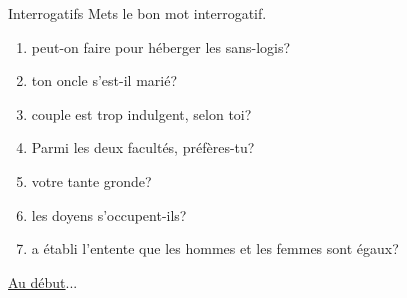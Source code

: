 \begin{frame}{Interrogatifs}
  Mets le bon mot interrogatif.
  \begin{enumerate}
    \item \underline{} peut-on faire pour héberger les sans-logis?
    \item \underline{} ton oncle s'est-il marié?
    \item \underline{} couple est trop indulgent, selon toi?
    \item Parmi les deux facultés, \underline{} préfères-tu?
    \item \underline{} votre tante gronde?
    \item \underline{} les doyens s'occupent-ils?
    \item \underline{} a établi l'entente que les hommes et les femmes sont égaux?
  \end{enumerate}
  \vspace{0.25cm}
  \raggedleft\raggedleft\hyperlink{début}{Au début}...
\end{frame}
